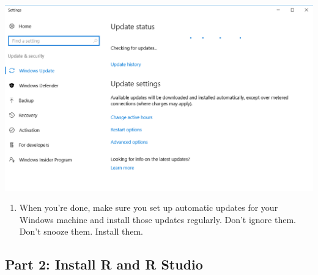 \documentclass[
  letterpaper,
  DIV=11,
  numbers=noendperiod]{scrreprt}
\providecommand{\tightlist}{%
  \setlength{\itemsep}{0pt}\setlength{\parskip}{0pt}}\usepackage{longtable,booktabs,array}
\begin{document}
\includegraphics{./images/Screen Shot 2020-07-30 at 5.47.33 PM.png}

\begin{enumerate}
\def\labelenumi{\arabic{enumi}.}
\setcounter{enumi}{2}
\tightlist
\item
  When you're done, make sure you set up automatic updates for your
  Windows machine and install those updates regularly. Don't ignore
  them. Don't snooze them. Install them.
\end{enumerate}

\hypertarget{part-2-install-r-and-r-studio}{%
\subsection{Part 2: Install R and R
Studio}\label{part-2-install-r-and-r-studio}}
\end{document}

